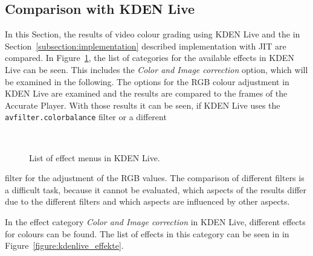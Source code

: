 \documentclass[../MasterThesis.tex]{subfiles}
\begin{document}


\subsection{Comparison with KDEN Live} \label{section:comparisonKDENLive}


\begin{minipage}{0.58\textwidth}
	
	In this Section, the results of video colour grading using KDEN Live and the in Section~\ref{subsection:implementation} described implementation with JIT are compared. In Figure~\ref{figure:kdenlive_effects}, the list of categories for the available effects in KDEN Live can be seen. This includes the \textit{Color and Image correction} option, which will be examined in the following. The options for the RGB colour adjustment in KDEN Live are examined and the results are compared to the frames of the Accurate Player. With those results it can be seen, if KDEN Live uses the \texttt{avfilter.colorbalance} filter or a different 
	
	
\end{minipage}\begin{minipage}{0.04\textwidth}
	\ 
\end{minipage}\begin{minipage}{0.38\textwidth}
	\begin{figure}[H]
		\begin{center}
			\caption[List of effect menus in KDEN Live.]{List of effect menus in KDEN Live.}
			\label{figure:kdenlive_effects}
		\end{center}
	\end{figure}
	\vfill
\end{minipage}

\vspace*{0.2em}

filter for the adjustment of the RGB values. 
The comparison of different filters is a difficult task, because it cannot be evaluated, which aspects of the results differ due to the different filters and which aspects are influenced by other aspects.


In the effect category \textit{Color and Image correction} in KDEN Live, different effects for colours can be found. The list of effects in this category can be seen in in Figure~\ref{figure:kdenlive_effekte}. 
\end{document}
